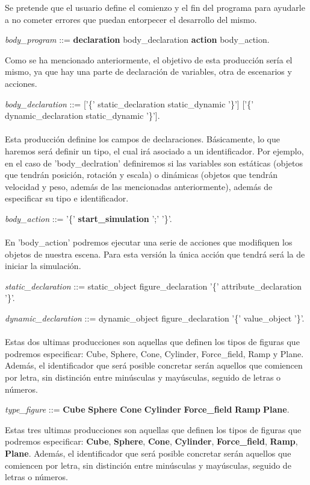 \documentclass[12pt]{article}
\begin{document}
Se pretende que el usuario define el comienzo y el fin del programa para ayudarle a no cometer errores que puedan entorpecer el desarrollo del mismo.

\noindent \textit{body\_program} ::= \textbf{declaration} body\_declaration \textbf{action} body\_action.

Como se ha mencionado anteriormente, el objetivo de esta producción sería el mismo, ya que hay una parte de declaración de variables, otra de escenarios y acciones.

\noindent \textit{body\_declaration} ::= ['\{' static\_declaration static\_dynamic '\}'] ['\{' dynamic\_declaration static\_dynamic '\}'].  \\ \\
Esta producción definine los campos de declaraciones. Básicamente, lo que haremos será definir un tipo, el cual irá asociado a un identificador. Por ejemplo, en el caso de 'body\_declration' definiremos si las variables son estáticas (objetos que tendrán posición, rotación y escala) o dinámicas (objetos que tendrán velocidad y peso, además de las mencionadas anteriormente), además de especificar su tipo e identificador.

\noindent \textit{body\_action} ::= '\{' \textbf{start\_simulation} ';' '\}'. \\ \\
En 'body\_action' podremos ejecutar una serie de acciones que modifiquen los objetos de nuestra escena. Para esta versión la única acción que tendrá será la de iniciar la simulación.

\noindent \textit{static\_declaration} ::= static\_object figure\_declaration '\{' attribute\_declaration '\}'.

\noindent \textit{dynamic\_declaration} ::= dynamic\_object figure\_declaration '\{' value\_object '\}'. \\ \\
Estas dos ultimas producciones son aquellas que definen los tipos de figuras que podremos especificar: Cube, Sphere, Cone, Cylinder, Force\_field, Ramp y Plane. Además, el identificador que será posible concretar serán aquellos que comiencen por letra, sin distinción entre minúsculas y mayúsculas, seguido de letras o números.

\noindent \textit{type\_figure} ::= \textbf{Cube} \textbar \textbf{Sphere} \textbar \textbf{Cone} \textbar \textbf{Cylinder} \textbar \textbf{Force\_field} \textbar \textbf{Ramp} \textbar  \textbf{Plane}.

Estas tres ultimas producciones son aquellas que definen los tipos de figuras que podremos especificar: \textbf{Cube}, \textbf{Sphere}, \textbf{Cone}, \textbf{Cylinder}, \textbf{Force\_field}, \textbf{Ramp}, \textbf{Plane}. Además, el identificador que será posible concretar serán aquellos que comiencen por letra, sin distinción entre minúsculas y mayúsculas, seguido de letras o números.
\end{document}
